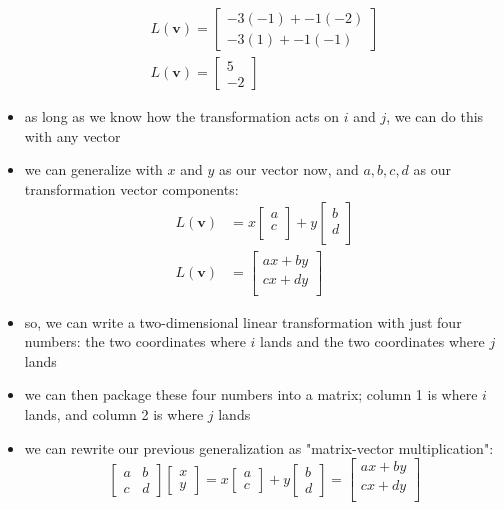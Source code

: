 \begin{itemize}
\begin{align}
        L(\mathbf{v}) = \begin{bmatrix}
        -3(-1) + -1(-2) \\
        -3(1) + -1(-1)
        \end{bmatrix} \\
        L(\mathbf{v}) = \begin{bmatrix}
            5 \\
            -2
        \end{bmatrix}
    \end{align}
    \item as long as we know how the transformation acts on $i$ and $j$, we can do this with any vector
    \item we can generalize with $x$ and $y$ as our vector now, and $a, b, c, d$ as our transformation vector components:
    \begin{align}
        L(\mathbf{v}) &= x \begin{bmatrix}
            a \\
            c \\
        \end{bmatrix} + y \begin{bmatrix}
            b \\
            d \\
        \end{bmatrix} \\
        L(\mathbf{v}) &= \begin{bmatrix}
            ax + by \\
            cx + dy \\
        \end{bmatrix}
    \end{align}
    \item so, we can write a two-dimensional linear transformation with just four numbers: the two coordinates where $i$ lands and the two coordinates where $j$ lands 
    \item we can then package these four numbers into a matrix; column 1 is where $i$ lands, and column 2 is where $j$ lands
    \item we can rewrite our previous generalization as "matrix-vector multiplication":
    $$ \begin{bmatrix}
        a & b \\
        c & d
    \end{bmatrix}
    \begin{bmatrix}
        x \\
        y
    \end{bmatrix} =
    x \begin{bmatrix}
        a \\
        c
    \end{bmatrix}
    + y \begin{bmatrix}
        b \\
        d
    \end{bmatrix} =
    \begin{bmatrix}
        ax + by \\
        cx + dy \\
    \end{bmatrix} $$
\end{itemize}

